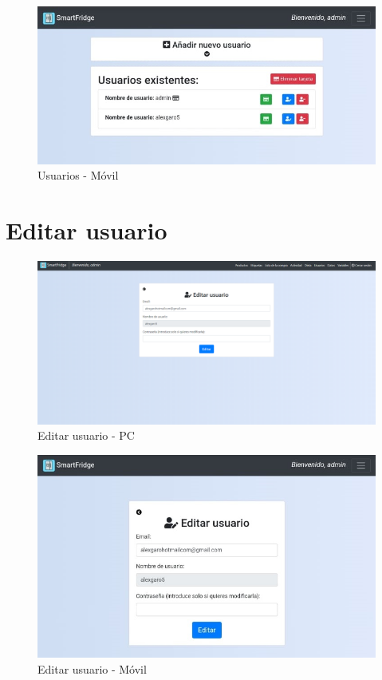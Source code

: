 \begin{figure}[h] 
    \centering
    \includegraphics[width=.50\textwidth]{capitulos/anexotres/Phone/User.jpeg}
    \caption{Usuarios - Móvil}
    \label{fig:userphone}
\end{figure}

\newpage
\section{Editar usuario}
\begin{figure}[h] 
    \centering
    \includegraphics[width=.90\textwidth]{capitulos/anexotres/PC/EditUser.png}
    \caption{Editar usuario - PC}
    \label{fig:edituserpc}
\end{figure}

\begin{figure}[h] 
    \centering
    \includegraphics[width=.50\textwidth]{capitulos/anexotres/Phone/EditUser.jpeg}
    \caption{Editar usuario - Móvil}
    \label{fig:edituserphone}
\end{figure}

\newpage
